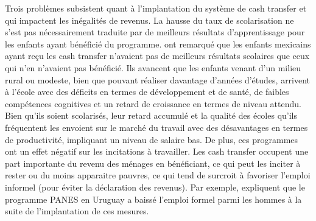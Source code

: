 \documentclass[pagesize, twoside=off, bibliography=totoc, DIV=calc, fontsize=12pt, a4paper, french]{scrartcl}
\begin{document}
Trois problèmes subsistent quant à l’implantation du système de cash transfer et qui impactent les inégalités de revenus.
La hausse du taux de scolarisation ne s’est pas nécessairement traduite par de meilleurs résultats d’apprentissage pour les enfants ayant bénéficié du programme.  ont remarqué que les enfants mexicains ayant reçu les cash transfer n’avaient pas de meilleurs résultats scolaires que ceux qui n’en n’avaient pas bénéficié. Ils avancent que les enfants venant d’un milieu rural ou modeste, bien que pouvant réaliser davantage d’années d’études, arrivent à l’école avec des déficits en termes de développement et de santé, de faibles compétences cognitives et un retard de croissance en termes de niveau attendu. Bien qu’ils soient scolarisés, leur retard accumulé et la qualité des écoles qu’ils fréquentent les envoient sur le marché du travail avec des désavantages en termes de productivité, impliquant un niveau de salaire bas. De plus, ces programmes ont un effet négatif sur les incitations à travailler. Les cash transfer occupent une part importante du revenu des ménages en bénéficiant, ce qui peut les inciter à rester ou du moins apparaitre pauvres, ce qui tend de surcroit à favoriser l’emploi informel (pour éviter la déclaration des revenus). Par exemple, \citet{amarante_2011} expliquent que le programme PANES en Uruguay a baissé l’emploi formel parmi les hommes à la suite de l’implantation de ces mesures. 
\end{document}
